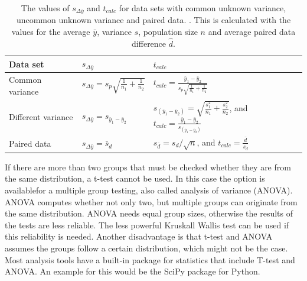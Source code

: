 \begin{itemize}
	\begin{table}[h!]
		\centering
		\caption{The values of $s_{\Delta\bar{y}}$ and $t_{calc}$ for data sets 
			with common unknown variance, uncommon unknown variance and paired 
			data. \cite{heiberger2004statistical}. This is calculated with the values for the average $\bar{y}$, variance $s$, population size $n$ and average paired data difference $\hat{d}$.}
		\label{tab:sdyandtcalc}
		\begin{tabular}{lll}
			\hline
			\textbf{Data set}  & \textbf{$s_{\Delta\bar{y}}$}     & 
			\textbf{$t_{calc}$}                                                
			\\ \hline
			Common variance    & $s_{\Delta\bar{y}} = s_p \sqrt{\frac{1}{n_1} + 
				\frac{1}{n_2}}$ & 
			$t_{calc} = \frac{\bar{y}_1-\bar{y}_2}{s_p \sqrt{\frac{1}{n_1} + 
					\frac{1}{n_2}}}         $                                      \\
			Different variance & $s_{\Delta\bar{y}} = s_{\bar{y}_1 - 
				\bar{y}_2}$    & 
			$s_{(\bar{y}_1-\bar{y}_2)} =\sqrt{\frac{s^2_1}{n_1} + 
				\frac{s^2_2}{n_2}}$, and $t_{calc} = \frac{\bar{y}_1 - 
				\bar{y}_2}{s_{(\bar{y}_1-\bar{y}_2)}}$ \\
			Paired data        & $s_{\Delta\bar{y}} = \bar{s}_d$           & 
			$s_{\bar{d}} = s_d / \sqrt{n}$, and $t_{calc} 	
			=\frac{\bar{d}}{s_{\bar{d}}}$                                       
			
			
			\\
			\hline
		\end{tabular}
	\end{table}
	
	If there are more than two groups that must be checked whether they are from the same distribution, a t-test cannot be used. In this case the option is availablefor a multiple group testing, also called analysis of variance (ANOVA). ANOVA computes whether not only two, but multiple groups can originate from the same distribution. ANOVA needs equal group sizes, otherwise the results of the tests are less reliable. The less powerful Kruskall Wallis test can be used if this reliability is needed. Another disadvantage is that t-test and ANOVA assumes the groups follow a certain distribution, which might not be the case\cite{heiberger2004statistical}.
	Most analysis tools have a built-in package for statistics that include T-test and ANOVA. An example for this would be the SciPy\cite{jones2014scipy} package for Python.
	

\end{itemize}
